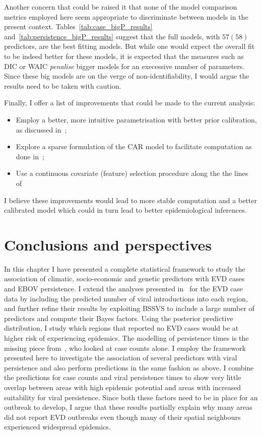 Another concern that could be raised it that none of the model comparison metrics employed here seem appropriate to discriminate between models in the present context.
Tables~\ref{tab:case_bigP_results} and~\ref{tab:persistence_bigP_results} suggest that the full models, with $57 (58)$ predictors, are the best fitting models.
But while one would expect the overall fit to be indeed better for these models, it is expected that the measures such as DIC or WAIC \textit{penalise} bigger models for an execessive number of parameters.
Since these big models are on the verge of non-identifiability, I would argue the results need to be taken with caution.

Finally, I offer a list of improvements that could be made to the current analysis:
\begin{itemize}
 \item Employ a better, more intuitive parametrisation with better prior calibration, as discussed in~\cite{Riebler2016};
 \item Explore a sparse formulation of the CAR model to facilitate computation as done in~\cite{Morris2017};
 \item Use a continuous covariate (feature) selection procedure along the the lines of~\cite{Piironen2017} 
\end{itemize}
I believe these improvements would lead to more stable computation and a better calibrated model which could in turn lead to better epidemiological inferences.


\section{Conclusions and perspectives}

In this chapter I have presented a complete statistical framework to study the association of climatic, socio-economic and genetic predictors with EVD cases and EBOV persistence.
I extend the analyses presented in~\cite{Dudas2017} for the EVD case data by including the predicted number of viral introductions into each region, and further refine their results by exploiting BSSVS to include a large number of predictors and compute their Bayes factors.
Using the posterior predictive distribution, I study which regions that reported no EVD cases would be at higher risk of experiencing epidemics.
The modelling of persistence times is the missing piece from~\cite{Dudas2017}, who looked at case counts alone.
I employ the framework presented here to investigate the association of several predictors with viral persistence and also perform predictions in the same fashion as above.
I combine the predictions for case counts and viral persistence times to show very little overlap between areas with high epidemic potential and areas with increased suitability for viral persistence.
Since both these factors need to be in place for an outbreak to develop, I argue that these results partially explain why many areas did not report EVD outbreaks even though many of their spatial neighbours experienced widespread epidemics.

